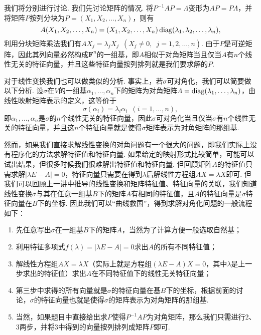 我们将分别进行讨论. 我们先讨论矩阵的情况. 将$P^{-1}AP=\varLambda$变形为$AP=P\varLambda$，并将矩阵$P$按列分块为$P=(X_1,X_2,\ldots,X_n)$，则有
\[A(X_1,X_2,\ldots,X_n)=(X_1,X_2,\ldots,X_n)\operatorname{diag}(\lambda_1,\lambda_2,\ldots,\lambda_n),\]
利用分块矩阵乘法我们有$AX_j=\lambda_jX_j\enspace(X_j\neq 0,\enspace j=1,2,\ldots,n)$. 由于$P$是可逆矩阵，因此其列向量必然构成$\mathbf{F}^n$的一组基，即$A$相似于对角矩阵当且仅当$A$有$n$个线性无关的特征向量，并且这些特征向量按列排列就是我们要求解的$P$.

对于线性变换我们也可以做类似的分析. 事实上，若$\sigma$可对角化，我们可以简要做以下分析. 设$\sigma$在$V$的一组基$\alpha_1,\ldots,\alpha_n$下的矩阵为对角矩阵$\varLambda=\operatorname{diag}(\lambda_1,\ldots,\lambda_n)$，由线性映射矩阵表示的定义，这等价于
\[\sigma(\alpha_i)=\lambda_i\alpha_i\enspace(i=1,\ldots,n),\]
即$\alpha_1,\ldots,\alpha_n$是$\sigma$的$n$个线性无关的特征向量，因此$\sigma$可对角化当且仅当$\sigma$有$n$个线性无关的特征向量，并且这$n$个特征向量就是使得$\sigma$矩阵表示为对角矩阵的那组基.

然而，如果我们直接求解线性变换的对角问题有一个很大的问题，即我们实际上没有程序化的方法求解特征值和特征向量. 如果给定的映射形式比较简单，可能可以试出结果，但很多时候我们很难解出特征值和特征向量. 但回顾矩阵$A$的特征值只需求解$|\lambda E-A|=0$，特征向量只需要在得到$\lambda$后解线性方程组$AX=\lambda X$即可. 但我们可以回顾上一讲中推导的线性变换和矩阵特征值、特征向量的关联，我们知道线性变换$\sigma$与其在任意一组基$B$下的矩阵$A$有相同的特征值，且$A$的特征向量是$\sigma$特征向量在$B$下的坐标. 因此我们可以``曲线救国''，得到求解对角化问题的一般流程如下：

\begin{enumerate}
    \item 先任意写出$\sigma$在一组基$B$下的矩阵$A$，当然为了计算方便一般选取自然基；

    \item 利用特征多项式$f(\lambda)=|\lambda E-A|=0$求出$A$的所有不同特征值；

    \item 解线性方程组$AX=\lambda X$（实际上就是方程组$(\lambda E-A)X=0$，其中$\lambda$是上一步求出的特征值）求出$A$在不同特征值下的线性无关特征向量；

    \item 第三步中求得的所有向量就是$\sigma$的特征向量在基$B$下的坐标，根据前面的讨论，$\sigma$的特征向量也就是使得$\sigma$的矩阵表示为对角矩阵的那组基.

    \item 当然，如果题目中直接给出求$P$使得$P^{-1}AP$为对角矩阵，那么我们只需进行2、3两步，并将3中得到的向量按列排列成矩阵$P$即可.
\end{enumerate}

